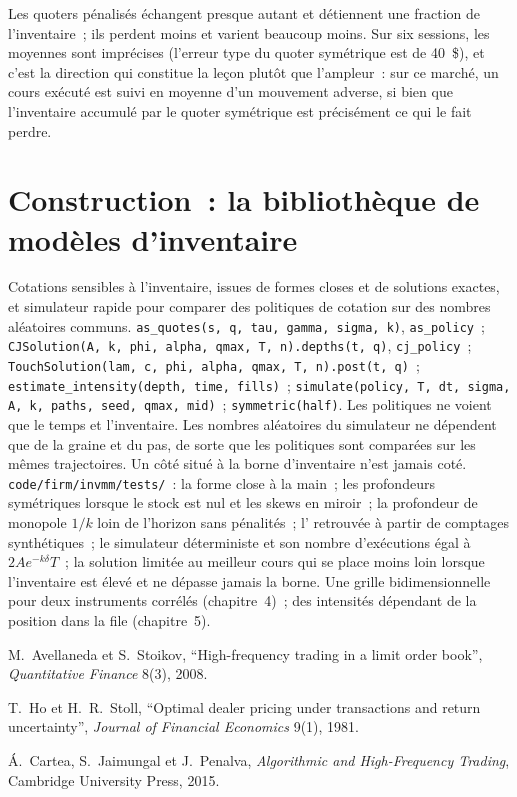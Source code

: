 Les quoters pénalisés échangent presque autant et détiennent une fraction de l'inventaire~; ils perdent moins et varient beaucoup moins. Sur six sessions, les moyennes sont
imprécises (l'erreur type du quoter symétrique est de 40~\$), et c'est la direction qui constitue la leçon plutôt que l'ampleur~: sur ce marché, un cours exécuté est
suivi en moyenne d'un mouvement adverse, si bien que l'inventaire accumulé par le quoter symétrique est précisément ce qui le fait perdre.

\section{Construction~: la bibliothèque de modèles d'inventaire}\label{bld:hf:inventory-models:invmm}

\begin{build}
 Cotations sensibles à l'inventaire, issues de formes closes et de solutions exactes, et simulateur rapide pour comparer des politiques de cotation sur des
nombres aléatoires communs.
 \texttt{as\_quotes(s, q, tau, gamma, sigma, k)}, \texttt{as\_policy}~; \texttt{CJSolution(A, k, phi, alpha, qmax, T, n).depths(t, q)},
\texttt{cj\_policy}~; \texttt{TouchSolution(lam, c, phi, alpha, qmax, T, n).post(t, q)}~; \texttt{estimate\_intensity(depth, time, fills)}~;
\texttt{simulate(policy, T, dt, sigma, A, k, paths, seed, qmax, mid)}~; \texttt{symmetric(half)}.
 Les politiques ne voient que le temps et l'inventaire. Les nombres aléatoires du simulateur ne dépendent que de la graine et du pas, de sorte que les politiques
sont comparées sur les mêmes trajectoires. Un côté situé à la borne d'inventaire n'est jamais coté.
 \texttt{code/firm/invmm/tests/}~: la forme close à la main~; les profondeurs symétriques lorsque le stock est nul et les skews en miroir~; la profondeur de monopole $1/k$
loin de l'horizon sans pénalités~; l' retrouvée à partir de comptages synthétiques~; le simulateur déterministe et son nombre d'exécutions
égal à $2Ae^{-k\delta}T$~; la solution limitée au meilleur cours qui se place moins loin lorsque l'inventaire est élevé et ne dépasse jamais la borne.
 Une grille bidimensionnelle pour deux instruments corrélés (chapitre~4)~; des intensités dépendant de la position dans la file (chapitre~5).
\end{build}

\begin{omsources}
\item M.~Avellaneda et S.~Stoikov, ``High-frequency trading in a limit order book'', \emph{Quantitative Finance} 8(3), 2008.
\item T.~Ho et H.~R.~Stoll, ``Optimal dealer pricing under transactions and return uncertainty'', \emph{Journal of Financial Economics} 9(1), 1981.
\item Á.~Cartea, S.~Jaimungal et J.~Penalva, \emph{Algorithmic and High-Frequency Trading}, Cambridge University Press, 2015.
\end{omsources}

